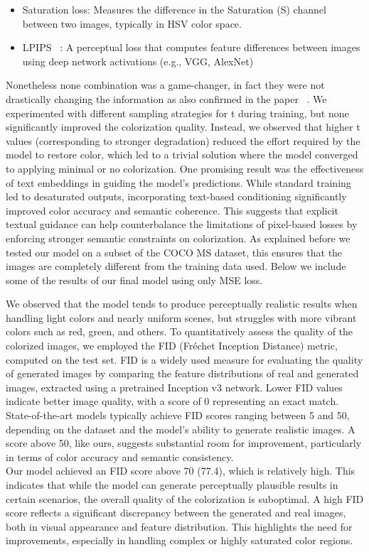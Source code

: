 \documentclass[10pt,twocolumn,letterpaper]{article}
\begin{document}
\begin{itemize}
\item Saturation loss: Measures the difference in the Saturation (S) channel between two images, typically in HSV color space.
\item LPIPS  ~\cite{LIPS}: A perceptual loss that computes feature differences between images using deep network activations (e.g., VGG, AlexNet)
\end{itemize}

Nonetheless none combination was a game-changer, in fact they were not drastically changing the information as also confirmed in the paper ~\cite{Ballester}.
We experimented with different sampling strategies for t during training, but none significantly improved the colorization quality. Instead, we observed that higher t values (corresponding to stronger degradation) reduced the effort required by the model to restore color, which led to a trivial solution where the model converged to applying minimal or no colorization.
One promising result was the effectiveness of text embeddings in guiding the model’s predictions. While standard training led to desaturated outputs, incorporating text-based conditioning significantly improved color accuracy and semantic coherence. This suggests that explicit textual guidance can help counterbalance the limitations of pixel-based losses by enforcing stronger semantic constraints on colorization.
As explained before we tested our model on a subset of the COCO MS dataset, this ensures that the images are completely different from the training data used. Below we include some of the results of our final model using only MSE loss.


We observed that the model tends to produce perceptually realistic results when handling light colors and nearly uniform scenes, but struggles with more vibrant colors such as red, green, and others.
To quantitatively assess the quality of the colorized images, we employed the FID (Fréchet Inception Distance) metric, computed on the test set. FID is a widely used measure for evaluating the quality of generated images by comparing the feature distributions of real and generated images, extracted using a pretrained Inception v3 network. Lower FID values indicate better image quality, with a score of 0 representing an exact match. State-of-the-art models typically achieve FID scores ranging between 5 and 50, depending on the dataset and the model's ability to generate realistic images. A score above 50, like ours, suggests substantial room for improvement, particularly in terms of color accuracy and semantic consistency.
\\
\indent
Our model achieved an FID score above 70 (77.4), which is relatively high. This indicates that while the model can generate perceptually plausible results in certain scenarios, the overall quality of the colorization is suboptimal. A high FID score reflects a significant discrepancy between the generated and real images, both in visual appearance and feature distribution. This highlights the need for improvements, especially in handling complex or highly saturated color regions.
\end{document}

